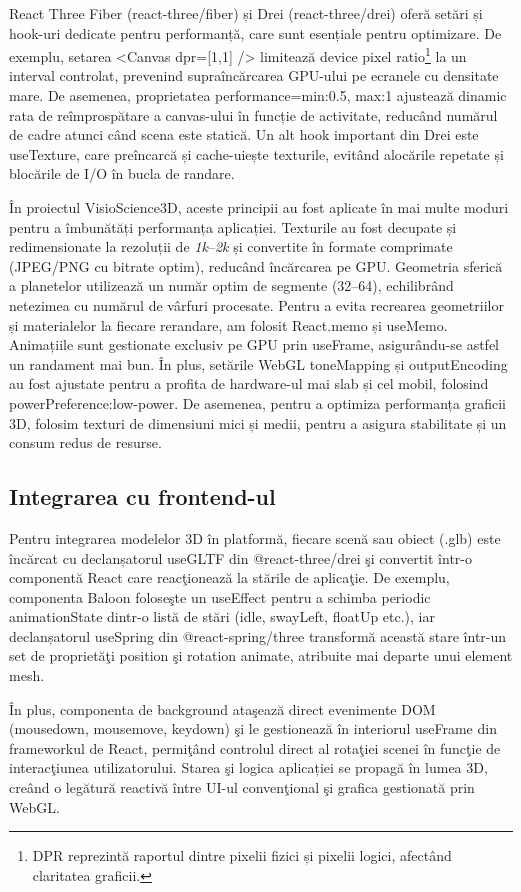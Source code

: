 React Three Fiber (react-three/fiber) și Drei (react-three/drei) oferă setări și hook-uri
dedicate pentru performanță, care sunt esențiale pentru optimizare. De exemplu, setarea
<Canvas dpr={[1,1]} /> limitează device pixel ratio\footnote{DPR reprezintă raportul dintre pixelii fizici și pixelii logici, afectând claritatea graficii.}
la un interval controlat, prevenind 
supraîncărcarea GPU-ului pe ecranele cu densitate mare. De asemenea, proprietatea performance={min:0.5, max:1}
ajustează dinamic rata de reîmprospătare a canvas-ului în funcție de activitate, reducând numărul de 
cadre atunci când scena este statică. Un alt hook important din Drei este useTexture, care 
preîncarcă și cache-uiește texturile, evitând alocările repetate și blocările de I/O în bucla de randare.

În proiectul VisioScience3D, aceste principii au fost aplicate în mai multe moduri pentru a 
îmbunătăți performanța aplicației. Texturile au fost decupate și redimensionate la rezoluții de 
\emph{1k}–\emph{2k} și convertite în formate comprimate (JPEG/PNG cu bitrate optim), reducând încărcarea pe GPU.
Geometria sferică a planetelor utilizează un număr optim de segmente (32–64), 
echilibrând netezimea cu numărul de vârfuri procesate. Pentru a evita recrearea geometriilor 
și materialelor la fiecare rerandare, am folosit React.memo și useMemo. 
Animațiile sunt gestionate exclusiv pe GPU prin useFrame, asigurându-se astfel un randament
mai bun. În plus, setările WebGL toneMapping și outputEncoding au fost ajustate
pentru a profita de hardware-ul mai slab și cel mobil, folosind powerPreference:low-power.
De asemenea, pentru a optimiza performanța graficii 3D, folosim texturi de dimensiuni mici și medii,
pentru a asigura stabilitate și un consum redus de resurse.

\subsection{Integrarea cu frontend-ul}

Pentru integrarea modelelor 3D în platformă, fiecare scenă sau obiect (.glb) este 
încărcat cu declanșatorul useGLTF din @react-three/drei şi convertit într-o
componentă React care reacţionează la stările de aplicaţie. De exemplu, componenta 
Baloon foloseşte un useEffect pentru a schimba periodic animationState
dintr-o listă de stări (idle, swayLeft, floatUp etc.), iar declanșatorul useSpring
din @react-spring/three transformă această stare într-un set de proprietăţi
position şi rotation animate, atribuite mai departe unui element 
mesh.

În plus, componenta de background ataşează direct evenimente DOM (mousedown, mousemove,
keydown) şi le gestionează în interiorul useFrame din frameworkul de React,
permiţând controlul direct al rotaţiei scenei în funcţie de interacţiunea utilizatorului.
Starea şi logica aplicației se propagă în lumea 3D, creând o legătură reactivă între UI-ul
convenţional şi grafica gestionată prin WebGL.








